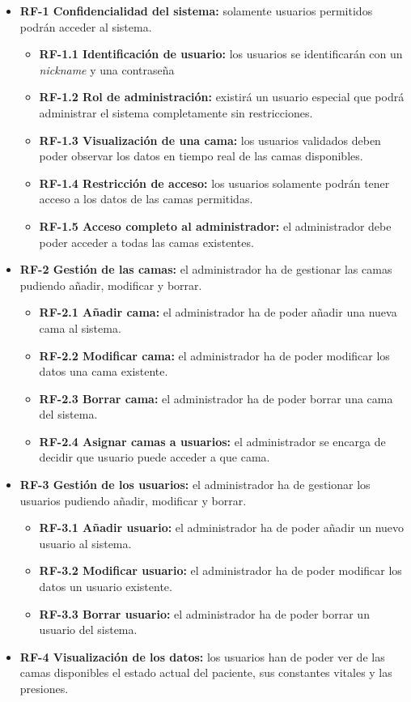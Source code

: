 \begin{itemize}
\tightlist
\item
\textbf{RF-1 Confidencialidad del sistema:} solamente usuarios permitidos podrán acceder al sistema.
	\begin{itemize}
		\tightlist
		\item
		\textbf{RF-1.1 Identificación de usuario:} los usuarios se identificarán con un \textit{nickname} y una contraseña 
		\item
		\textbf{RF-1.2 Rol de administración:} existirá un usuario especial que podrá administrar el sistema completamente sin restricciones.
		\item 
		\textbf{RF-1.3 Visualización de una cama:} los usuarios validados deben poder observar los datos en tiempo real de las camas disponibles. 
		\item
		\textbf{RF-1.4 Restricción de acceso:} los usuarios solamente podrán tener acceso a los datos de las camas permitidas. 
		\item
		\textbf{RF-1.5 Acceso completo al administrador:} el administrador debe poder acceder a todas las camas existentes. 
	\end{itemize}	
\item
\textbf{RF-2 Gestión de las camas:} el administrador ha de gestionar las camas pudiendo añadir, modificar y borrar.
	\begin{itemize}
		\tightlist
		\item
		\textbf{RF-2.1 Añadir cama:} el administrador ha de poder añadir una nueva cama al sistema.
		\item
		\textbf{RF-2.2 Modificar cama:} el administrador ha de poder modificar los datos una cama existente.
		\item
		\textbf{RF-2.3 Borrar cama:} el administrador ha de poder borrar una cama del sistema.
		\item
		\textbf{RF-2.4 Asignar camas a usuarios:} el administrador se encarga de decidir que usuario puede acceder a que cama.
	\end{itemize}
\item
\textbf{RF-3 Gestión de los usuarios:} el administrador ha de gestionar los usuarios pudiendo añadir, modificar y borrar.
	\begin{itemize}
		\tightlist
		\item
		\textbf{RF-3.1 Añadir usuario:} el administrador ha de poder añadir un nuevo usuario al sistema.
		\item
		\textbf{RF-3.2 Modificar usuario:} el administrador ha de poder modificar los datos un usuario existente.
		\item
		\textbf{RF-3.3 Borrar usuario:} el administrador ha de poder borrar un usuario del sistema.
	\end{itemize}
\item 
\textbf{RF-4 Visualización de los datos:} los usuarios han de poder ver de las camas disponibles el estado actual del paciente, sus constantes vitales y las presiones.
\end{itemize}	

